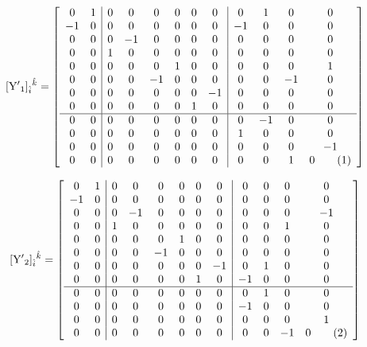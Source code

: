 \documentclass[12pt]{article}
\newcommand\numberthis{\addtocounter{equation}{1}\tag{\theequation}}
\let\bm\relax
\newcommand{\bm}[1]{{\boldsymbol{#1}}}
\begin{document}
\[[{\bm{\rm Y'}_1}]_{\hat i}{}^{\hat k}= 
\left[\begin{array}{cc|cccccc|cccc}
 0 & 1 & 0 & 0 & 0 & 0 & 0 & 0 & 0 & 1 & 0 & 0 \\
 -1 & 0 & 0 & 0 & 0 & 0 & 0 & 0 & -1 & 0 & 0 & 0 \\
 0 & 0 & 0 & -1 & 0 & 0 & 0 & 0 & 0 & 0 & 0 & 0 \\
 0 & 0 & 1 & 0 & 0 & 0 & 0 & 0 & 0 & 0 & 0 & 0 \\
 0 & 0 & 0 & 0 & 0 & 1 & 0 & 0 & 0 & 0 & 0 & 1 \\
 0 & 0 & 0 & 0 & -1 & 0 & 0 & 0 & 0 & 0 & -1 & 0 \\
 0 & 0 & 0 & 0 & 0 & 0 & 0 & -1 & 0 & 0 & 0 & 0 \\
 0 & 0 & 0 & 0 & 0 & 0 & 1 & 0 & 0 & 0 & 0 & 0 \\
 \hline
 0 & 0 & 0 & 0 & 0 & 0 & 0 & 0 & 0 & -1 & 0 & 0 \\
 0 & 0 & 0 & 0 & 0 & 0 & 0 & 0 & 1 & 0 & 0 & 0 \\
 0 & 0 & 0 & 0 & 0 & 0 & 0 & 0 & 0 & 0 & 0 & -1 \\
 0 & 0 & 0 & 0 & 0 & 0 & 0 & 0 & 0 & 0 & 1 & 0 
\numberthis\end{array}\right] \]

\[[{\bm{\rm Y'}_2}]_{\hat i}{}^{\hat k}= 
\left[\begin{array}{cc|cccccc|cccc}
 0 & 1 & 0 & 0 & 0 & 0 & 0 & 0 & 0 & 0 & 0 & 0 \\
 -1 & 0 & 0 & 0 & 0 & 0 & 0 & 0 & 0 & 0 & 0 & 0 \\
 0 & 0 & 0 & -1 & 0 & 0 & 0 & 0 & 0 & 0 & 0 & -1 \\
 0 & 0 & 1 & 0 & 0 & 0 & 0 & 0 & 0 & 0 & 1 & 0 \\
 0 & 0 & 0 & 0 & 0 & 1 & 0 & 0 & 0 & 0 & 0 & 0 \\
 0 & 0 & 0 & 0 & -1 & 0 & 0 & 0 & 0 & 0 & 0 & 0 \\
 0 & 0 & 0 & 0 & 0 & 0 & 0 & -1 & 0 & 1 & 0 & 0 \\
 0 & 0 & 0 & 0 & 0 & 0 & 1 & 0 & -1 & 0 & 0 & 0 \\
 \hline
 0 & 0 & 0 & 0 & 0 & 0 & 0 & 0 & 0 & 1 & 0 & 0 \\
 0 & 0 & 0 & 0 & 0 & 0 & 0 & 0 & -1 & 0 & 0 & 0 \\
 0 & 0 & 0 & 0 & 0 & 0 & 0 & 0 & 0 & 0 & 0 & 1 \\
 0 & 0 & 0 & 0 & 0 & 0 & 0 & 0 & 0 & 0 & -1 & 0 
\numberthis\end{array}\right] \]
\end{document}

